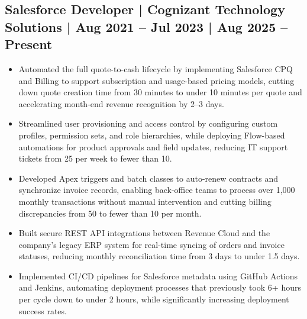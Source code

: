 \documentclass[a4paper,11pt]{article}
\begin{document}
\subsection{Salesforce Developer | Cognizant Technology Solutions | Aug 2021 – Jul 2023 | Aug 2025 – Present}
\begin{itemize}
    \item Automated the full quote-to-cash lifecycle by implementing Salesforce CPQ and Billing to support subscription and usage-based pricing models, cutting down quote creation time from 30 minutes to under 10 minutes per quote and accelerating month-end revenue recognition by 2–3 days.
    \item Streamlined user provisioning and access control by configuring custom profiles, permission sets, and role hierarchies, while deploying Flow-based automations for product approvals and field updates, reducing IT support tickets from 25 per week to fewer than 10.
    \item Developed Apex triggers and batch classes to auto-renew contracts and synchronize invoice records, enabling back-office teams to process over 1,000 monthly transactions without manual intervention and cutting billing discrepancies from 50 to fewer than 10 per month.
    \item Built secure REST API integrations between Revenue Cloud and the company's legacy ERP system for real-time syncing of orders and invoice statuses, reducing monthly reconciliation time from 3 days to under 1.5 days.
    \item Implemented CI/CD pipelines for Salesforce metadata using GitHub Actions and Jenkins, automating deployment processes that previously took 6+ hours per cycle down to under 2 hours, while significantly increasing deployment success rates.
\end{itemize}
\end{document}

